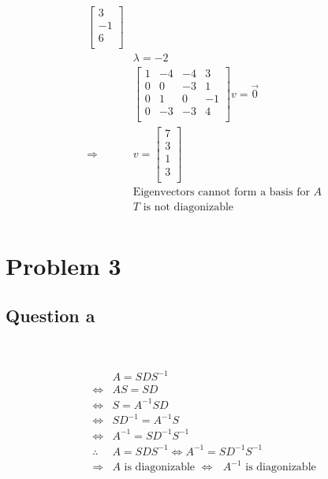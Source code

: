 \documentclass{article}
\begin{document}
\begin{equation*}
\begin{split}
\begin{bmatrix}
            3\\
            -1\\
            6\\
        \end{bmatrix}\\
        &\lambda=-2\\
        &\begin{bmatrix}
            1&-4&-4&3\\
            0&0&-3&1\\
            0&1&0&-1\\
            0&-3&-3&4\\
        \end{bmatrix}v=\overrightarrow{0}\\
        \Rightarrow&v=\begin{bmatrix}
            7\\
            3\\
            1\\
            3\\
        \end{bmatrix}\\
        &\text{Eigenvectors cannot form a basis for }A\\
        &T\text{ is not diagonizable}\\
    \end{split}
\end{equation*}

\newpage

\section{Problem 3}

\subsection{Question a}

~

\begin{equation*}
    \begin{split}
        &A=SDS^{-1}\\
        \Leftrightarrow &AS=SD\\
        \Leftrightarrow &S=A^{-1}SD\\
        \Leftrightarrow &SD^{-1}=A^{-1}S\\
        \Leftrightarrow &A^{-1}=SD^{-1}S^{-1}\\
        \therefore &A=SDS^{-1}\Leftrightarrow A^{-1}=SD^{-1}S^{-1}\\
        \Rightarrow &A\text{ is diagonizable } \Leftrightarrow \text{ } A^{-1} \text{ is diagonizable}
    \end{split}
\end{equation*}
\end{document}

